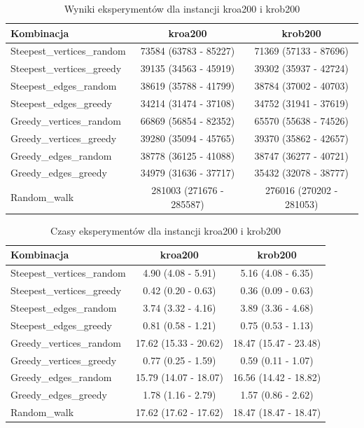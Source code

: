 \documentclass[12pt,a4paper]{article}
\begin{document}
\begin{table}[H]
\centering
\caption{Wyniki eksperymentów dla instancji kroa200 i krob200}
\begin{tabular}{lcc}
\toprule
\textbf{Kombinacja} & \textbf{kroa200} & \textbf{krob200} \\
\midrule
Steepest\_vertices\_random & 73584 (63783 - 85227) & 71369 (57133 - 87696) \\
Steepest\_vertices\_greedy & 39135 (34563 - 45919) & 39302 (35937 - 42724) \\
Steepest\_edges\_random & 38619 (35788 - 41799) & 38784 (37002 - 40703) \\
Steepest\_edges\_greedy & 34214 (31474 - 37108) & 34752 (31941 - 37619) \\
Greedy\_vertices\_random & 66869 (56854 - 82352) & 65570 (55638 - 74526) \\
Greedy\_vertices\_greedy & 39280 (35094 - 45765) & 39370 (35862 - 42657) \\
Greedy\_edges\_random & 38778 (36125 - 41088) & 38747 (36277 - 40721) \\
Greedy\_edges\_greedy & 34979 (31636 - 37717) & 35432 (32078 - 38777) \\
Random\_walk & 281003 (271676 - 285587) & 276016 (270202 - 281053) \\
\bottomrule
\end{tabular}
\end{table}

\begin{table}[H]
\centering
\caption{Czasy eksperymentów dla instancji kroa200 i krob200}
\begin{tabular}{lcc}
\toprule
\textbf{Kombinacja} & \textbf{kroa200} & \textbf{krob200} \\
\midrule
Steepest\_vertices\_random & 4.90 (4.08 - 5.91) & 5.16 (4.08 - 6.35) \\
Steepest\_vertices\_greedy & 0.42 (0.20 - 0.63) & 0.36 (0.09 - 0.63) \\
Steepest\_edges\_random & 3.74 (3.32 - 4.16) & 3.89 (3.36 - 4.68) \\
Steepest\_edges\_greedy & 0.81 (0.58 - 1.21) & 0.75 (0.53 - 1.13) \\
Greedy\_vertices\_random & 17.62 (15.33 - 20.62) & 18.47 (15.47 - 23.48) \\
Greedy\_vertices\_greedy & 0.77 (0.25 - 1.59) & 0.59 (0.11 - 1.07) \\
Greedy\_edges\_random & 15.79 (14.07 - 18.07) & 16.56 (14.42 - 18.82) \\
Greedy\_edges\_greedy & 1.78 (1.16 - 2.79) & 1.57 (0.86 - 2.62) \\
Random\_walk & 17.62 (17.62 - 17.62) & 18.47 (18.47 - 18.47) \\
\bottomrule
\end{tabular}
\end{table}
\end{document}
